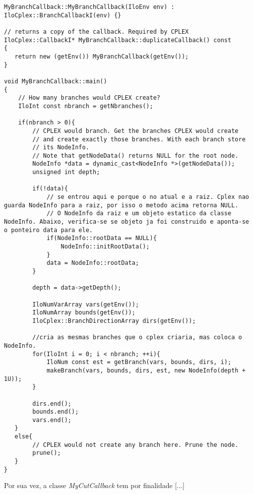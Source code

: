 \begin{lstlisting}[style=cplusplusListStyle, caption= Código referente à  classe \emph{MyBranchCallback}, label=cod:branchCallback]
MyBranchCallback::MyBranchCallback(IloEnv env) : IloCplex::BranchCallbackI(env) {}   

// returns a copy of the callback. Required by CPLEX
IloCplex::CallbackI* MyBranchCallback::duplicateCallback() const 
{ 
   return new (getEnv()) MyBranchCallback(getEnv()); 
}   

void MyBranchCallback::main()
{
	// How many branches would CPLEX create? 
	IloInt const nbranch = getNbranches(); 

	if(nbranch > 0){ 
		// CPLEX would branch. Get the branches CPLEX would create 
		// and create exactly those branches. With each branch store 
		// its NodeInfo. 
		// Note that getNodeData() returns NULL for the root node. 
		NodeInfo *data = dynamic_cast<NodeInfo *>(getNodeData()); 
		unsigned int depth;
   
		if(!data){
		   	// se entrou aqui e porque o no atual e a raiz. Cplex nao guarda NodeInfo para a raiz, por isso o metodo acima retorna NULL.
			// O NodeInfo da raiz e um objeto estatico da classe NodeInfo. Abaixo, verifica-se se objeto ja foi construido e aponta-se o ponteiro data para ele.
			if(NodeInfo::rootData == NULL){
				NodeInfo::initRootData();
			}
			data = NodeInfo::rootData;
		}

		depth = data->getDepth();

		IloNumVarArray vars(getEnv());
		IloNumArray bounds(getEnv()); 
		IloCplex::BranchDirectionArray dirs(getEnv());   

		//cria as mesmas branches que o cplex criaria, mas coloca o NodeInfo.
		for(IloInt i = 0; i < nbranch; ++i){ 
			IloNum const est = getBranch(vars, bounds, dirs, i);
			makeBranch(vars, bounds, dirs, est, new NodeInfo(depth + 1U)); 
		} 

		dirs.end(); 
		bounds.end(); 
		vars.end(); 
   } 
   else{ 
		// CPLEX would not create any branch here. Prune the node. 
		prune(); 
   } 
}

\end{lstlisting}

Por sua vez, a classe \emph{MyCutCallback} tem por finalidade {\color{red}[...]}

